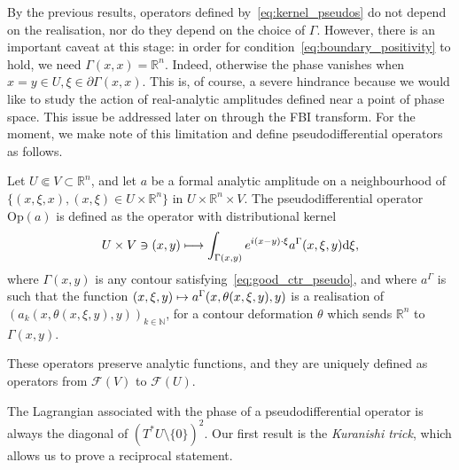\documentclass[AHL,Unicode,longabstracts,published]{cedram}
\newcommand{\Opp}{\mathrm{Op}}
\newcommand{\clF}{\mathcal{F}}
\newcommand\1{\mathds{1}}
\newcommand{\R}{\mathbb{R}}
\newcommand{\N}{\mathbb{N}}
\newcommand{\dd}{\mathrm{d}}
\let\oldmapsto\mapsto
\renewcommand*{\mapsto}{\mathchoice{\longmapsto}{\oldmapsto}{\oldmapsto}{\oldmapsto}}
\begin{document}
\begin{rema}\label{rem:pseudo_not_microlocal}
By the previous results, operators defined by~\eqref{eq:kernel_pseudos} do not depend on the realisation, nor do they depend on the choice of $\Gamma$. However, there is an important caveat at this stage: in order for condition~\eqref{eq:boundary_positivity} to hold, we need ${\Gamma(x,x)=\R^n}$. Indeed, otherwise the phase vanishes when $x=y\in U,\xi\in \partial \Gamma(x,x)$. This is, of course, a severe hindrance because we would like to study the action of real-analytic amplitudes defined near a point of phase space. This issue be addressed later on through the FBI transform. For the moment, we make note of this limitation and define pseudodifferential operators as follows.
\end{rema}

\begin{defi}\label{def:pseudos}
Let $U\Subset V\subset \R^n$, and let $a$ be a formal analytic amplitude on a neighbourhood of $\{(x,\xi,x),(x,\xi)\in U\times \R^n\}$ in $U\times \R^n\times V$. The pseudodifferential operator $\Opp(a)$ is defined as the operator with distributional kernel
\[
U\times V\ni (x,y)\mapsto
\int_{\Gamma(x,y)} e^{i(x-y)\cdot\xi}a^{\Gamma}(x,\xi,y)\dd \xi,
\]
where $\Gamma(x,y)$ is any contour satisfying~\eqref{eq:good_ctr_pseudo}, and where $a^{\Gamma}$ is such that the function $(x,\xi,y)\mapsto a^{\Gamma}(x,\theta(x,\xi,y),y)$ is a realisation of $(a_k(x,\theta(x,\xi,y),y))_{k\in \N}$, for a contour deformation $\theta$ which sends $\R^n$ to $\Gamma(x,y)$.

These operators preserve analytic functions, and they are uniquely defined as operators from $\clF(V)$ to $\clF(U)$.
\end{defi}

The Lagrangian associated with the phase of a pseudodifferential operator is always the diagonal of $(T^*U\setminus \{0\})^2$. Our first result is the \emph{Kuranishi trick}, which allows us to prove a reciprocal statement.
\end{document}
